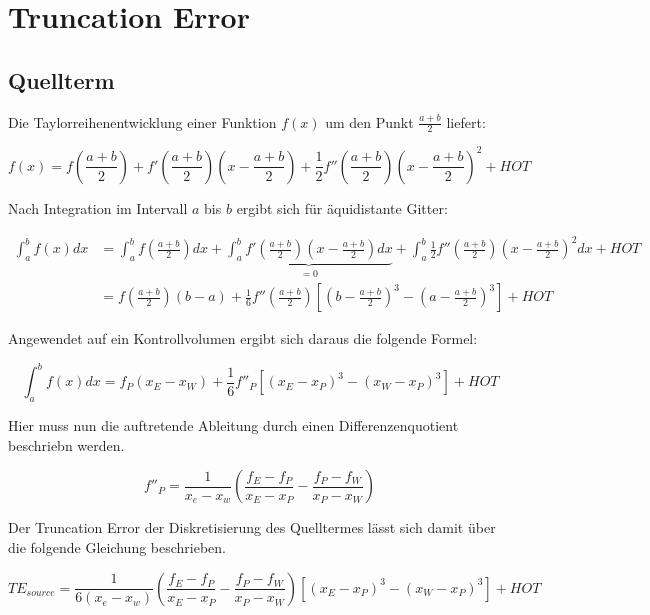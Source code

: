 \documentclass[10pt, ngerman,colorback,accentcolor=tud2d]{tudreport}
\begin{document}
\chapter{Truncation Error}
\label{cha:Truncation Error}

\newcommand{\ab}{\frac{a+b}{2}}
\newcommand{\abk}{\left(\frac{a+b}{2}\right)}

\section{Quellterm}
\label{sec:Quellterm}


Die Taylorreihenentwicklung einer Funktion $f(x)$ um den Punkt $\ab$
liefert:

\begin{equation*}
  f(x) = f\abk +
  f'\abk\left(x-\ab\right) +
  \frac{1}{2}f''\abk{\left(x-\ab\right)}^2 + HOT
\end{equation*}

Nach Integration im Intervall $a$ bis $b$ ergibt sich für äquidistante Gitter:

\begin{align*}
  \int_a^b f(x) dx &= \int_a^b f\abk dx +
  \underbrace{\int_a^b f'\abk \left( x - \ab\right) dx}_{=0} +
  \int_a^b \frac{1}{2}f''\abk{\left(x-\ab\right)}^2 dx + HOT\\
  &= f\abk (b-a) + \frac{1}{6} f''\abk
  \left[\left( b-\ab \right)^3 - \left(a-\ab\right)^3 \right] + HOT
\end{align*}

Angewendet auf ein Kontrollvolumen ergibt sich daraus die folgende Formel:

\begin{equation*}
  \int_a^b f(x)dx = f_P(x_E-x_W) + \frac{1}{6} f''_P \left[{{(x_E-x_P)}^3-{(x_W-x_P)}^3}\right] + HOT
\end{equation*}

Hier muss nun die auftretende Ableitung durch einen Differenzenquotient beschriebn werden.

\begin{equation*}
  f''_P = \frac{1}{x_e-x_w}\left(\frac{f_E-f_P}{x_E-x_P}-\frac{f_P-f_W}{x_P-x_W}\right)
\end{equation*}

Der Truncation Error der Diskretisierung des Quelltermes lässt sich damit über die
folgende Gleichung beschrieben.

\begin{equation}
  TE_{source} = \frac{1}{6(x_e-x_w)}\left(\frac{f_E-f_P}{x_E-x_P}-\frac{f_P-f_W}{x_P-x_W}\right)
  \left[{{(x_E-x_P)}^3-{(x_W-x_P)}^3}\right] + HOT
\end{equation}
\end{document}
